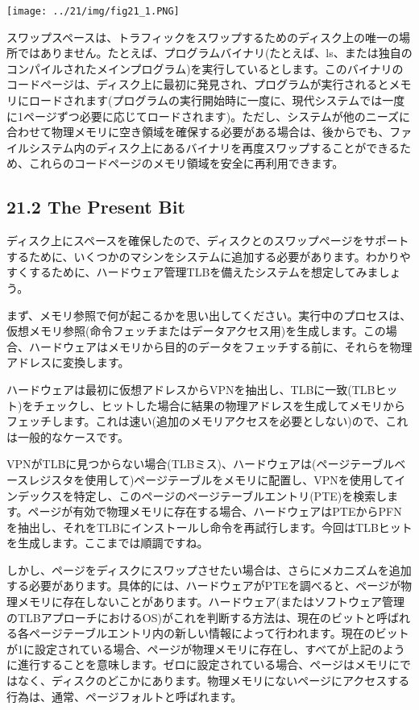 \texttt{[image: ../21/img/fig21\_1.PNG]}

スワップスペースは、トラフィックをスワップするためのディスク上の唯一の場所ではありません。たとえば、プログラムバイナリ(たとえば、ls、または独自のコンパイルされたメインプログラム)を実行しているとします。このバイナリのコードページは、ディスク上に最初に発見され、プログラムが実行されるとメモリにロードされます(プログラムの実行開始時に一度に、現代システムでは一度に1ページずつ必要に応じてロードされます)。ただし、システムが他のニーズに合わせて物理メモリに空き領域を確保する必要がある場合は、後からでも、ファイルシステム内のディスク上にあるバイナリを再度スワップすることができるため、これらのコードページのメモリ領域を安全に再利用できます。

\hypertarget{the-present-bit}{%
\subsection*{21.2 The Present Bit}\label{the-present-bit}}

ディスク上にスペースを確保したので、ディスクとのスワップページをサポートするために、いくつかのマシンをシステムに追加する必要があります。わかりやすくするために、ハードウェア管理TLBを備えたシステムを想定してみましょう。

まず、メモリ参照で何が起こるかを思い出してください。実行中のプロセスは、仮想メモリ参照(命令フェッチまたはデータアクセス用)を生成します。この場合、ハードウェアはメモリから目的のデータをフェッチする前に、それらを物理アドレスに変換します。

ハードウェアは最初に仮想アドレスからVPNを抽出し、TLBに一致(TLBヒット)をチェックし、ヒットした場合に結果の物理アドレスを生成してメモリからフェッチします。これは速い(追加のメモリアクセスを必要としない)ので、これは一般的なケースです。

VPNがTLBに見つからない場合(TLBミス)、ハードウェアは(ページテーブルベースレジスタを使用して)ページテーブルをメモリに配置し、VPNを使用してインデックスを特定し、このページのページテーブルエントリ(PTE)を検索します。ページが有効で物理メモリに存在する場合、ハードウェアはPTEからPFNを抽出し、それをTLBにインストールし命令を再試行します。今回はTLBヒットを生成します。ここまでは順調ですね。

しかし、ページをディスクにスワップさせたい場合は、さらにメカニズムを追加する必要があります。具体的には、ハードウェアがPTEを調べると、ページが物理メモリに存在しないことがあります。ハードウェア(またはソフトウェア管理のTLBアプローチにおけるOS)がこれを判断する方法は、現在のビットと呼ばれる各ページテーブルエントリ内の新しい情報によって行われます。現在のビットが1に設定されている場合、ページが物理メモリに存在し、すべてが上記のように進行することを意味します。ゼロに設定されている場合、ページはメモリにではなく、ディスクのどこかにあります。物理メモリにないページにアクセスする行為は、通常、ページフォルトと呼ばれます。

